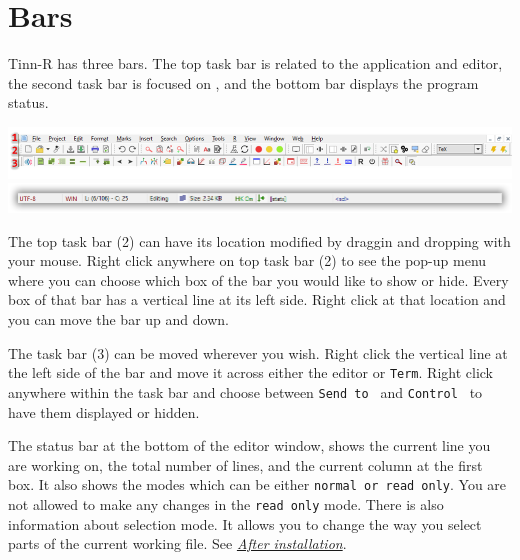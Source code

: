 
\section{Bars}

Tinn-R has three bars. The top task bar is related to the application and editor,
the second task bar is focused on \RR{}, and the bottom bar displays the program status.

\vspace{5mm}
\includegraphics[width=\headwidth]{./res/parts_02.png} \\
\includegraphics[width=\headwidth]{./res/status_bar.png}
\vspace{5mm}

The top task bar (2) can have its location modified by draggin and dropping with your mouse.
Right click anywhere on top task bar (2) to see the pop-up menu where you can choose which box
of the bar you would like to show or hide. Every box of that bar has a vertical line at its left side.
Right click at that location and you can move the bar up and down.

The \RR{} task bar (3) can be moved wherever you wish. Right click the vertical line at the left side of the
bar and move it across either the editor or \texttt{Term}. Right click anywhere within the \RR{} task bar and choose between
\texttt{Send to \RR{}} and \texttt{Control \RR{}} to have them displayed or hidden.

The status bar at the bottom of the editor window, shows the current line you are working on,
the total number of lines, and the current column at the first box.
It also shows the modes which can be either \texttt{normal or read only}.
You are not allowed to make any changes in the \texttt{read only} mode.
There is also information about selection mode. It allows you to change the way you select parts of the current working file.
See \textit{\href{\#secrets\_after\_installation}{After installation}}.
